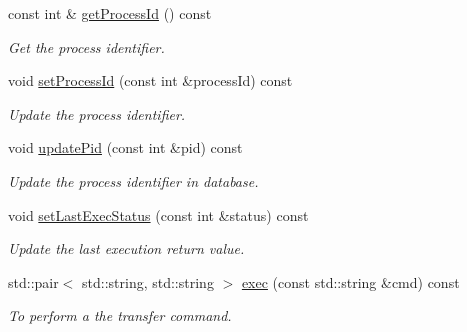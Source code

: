 \begin{DoxyCompactItemize}
const int \& \hyperlink{classTransferExec_a41b8794625e6ec9d2e8ebcccddfa3a5b}{getProcessId} () const 
\begin{DoxyCompactList}\small\item\em Get the process identifier. \item\end{DoxyCompactList}\item 
\hypertarget{classTransferExec_acb9e636d549a5555ab434dce1ff59077}{
void \hyperlink{classTransferExec_acb9e636d549a5555ab434dce1ff59077}{setProcessId} (const int \&processId) const }
\label{classTransferExec_acb9e636d549a5555ab434dce1ff59077}

\begin{DoxyCompactList}\small\item\em Update the process identifier. \item\end{DoxyCompactList}\item 
\hypertarget{classTransferExec_a75a2d426509b3c63f2a8f0a658d9596f}{
void \hyperlink{classTransferExec_a75a2d426509b3c63f2a8f0a658d9596f}{updatePid} (const int \&pid) const }
\label{classTransferExec_a75a2d426509b3c63f2a8f0a658d9596f}

\begin{DoxyCompactList}\small\item\em Update the process identifier in database. \item\end{DoxyCompactList}\item 
\hypertarget{classTransferExec_ac345dea738495067a0e10c8cc6ee1874}{
void \hyperlink{classTransferExec_ac345dea738495067a0e10c8cc6ee1874}{setLastExecStatus} (const int \&status) const }
\label{classTransferExec_ac345dea738495067a0e10c8cc6ee1874}

\begin{DoxyCompactList}\small\item\em Update the last execution return value. \item\end{DoxyCompactList}\item 
std::pair$<$ std::string, std::string $>$ \hyperlink{classTransferExec_a661a194a292e717664ae1145f5a151d3}{exec} (const std::string \&cmd) const 
\begin{DoxyCompactList}\small\item\em To perform a the transfer command. \item\end{DoxyCompactList}\end{DoxyCompactItemize}
